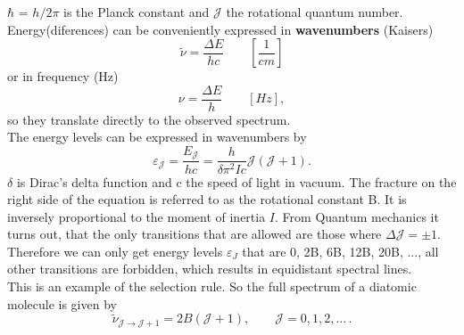 \documentclass[a4paper,fleqn]{article}
\renewcommand{\epsilon}{\varepsilon}  %
\begin{document}
$\hbar$ = $h/2\pi$ is the Planck constant and $\mathcal{J}$ the rotational quantum number. \\
Energy(diferences) can be conveniently expressed in \textbf{wavenumbers} (Kaisers)
\begin{equation}
\tilde{\nu} = \frac{\Delta E}{hc} \qquad \left[\frac{1}{cm}\right]
\end{equation}
or in frequency (Hz)
\begin{equation}
\nu = \frac{\Delta E}{h} \qquad \left[Hz\right],
\end{equation}
so they translate directly to the observed spectrum.\\
The energy levels can be expressed in wavenumbers by
\begin{equation}
\epsilon_\mathcal{J} = \frac{E_\mathcal{J}}{hc} = \frac{h}{\delta \pi^2 I c} \mathcal{J}(\mathcal{J}+1).
\end{equation}
$\delta$ is Dirac's delta function and c the speed of light in vacuum. The fracture on the right side of the equation is referred to as the rotational constant B. It is inversely proportional to the moment of inertia $I$. From Quantum mechanics it turns out, that the only transitions that are allowed are those where $\Delta \mathcal{J} = \pm1$. Therefore we can only get energy levels $\epsilon_J$ that are 0, 2B, 6B, 12B, 20B, ..., all other transitions are forbidden, which results in equidistant spectral lines. \\
This is an example of the selection rule. So the full spectrum of a diatomic molecule is given by
\begin{equation}
\tilde{\nu}_{\mathcal{J}\rightarrow \mathcal{J}+1} = 2B(\mathcal{J}+1), \qquad \mathcal{J} = 0, 1, 2, ...\,.
\end{equation}






\end{document}

